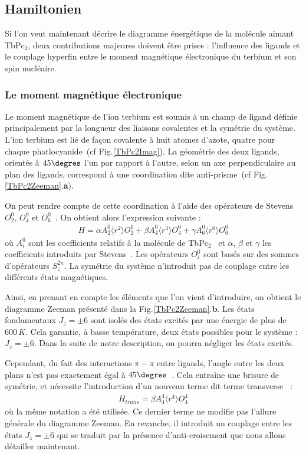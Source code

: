 \subsection{Hamiltonien}

Si l'on veut maintenant décrire le diagramme énergétique de la molécule aimant TbPc$_{2}$, deux contributions majeures doivent être prises : l'influence des ligands et le couplage hyperfin entre le moment magnétique électronique du terbium et son spin nucléaire.

\subsubsection{Le moment magnétique électronique}
Le moment magnétique de l'ion terbium est soumis à un champ de ligand définie principalement par la longueur des liaisons covalentes et la symétrie du système. 
L'ion terbium est lié de façon covalente à huit atomes d'azote, quatre pour chaque phatlocyanide~(cf Fig.\ref{TbPc2Imag}). La géométrie des deux ligands, orientés à $45\degres$ l'un par rapport à l'autre, selon un axe perpendiculaire au plan des ligands, correspond à une coordination dite anti-prisme~(cf Fig.\ref{TbPc2Zeeman}.\textbf{a}). 

On peut rendre compte de cette coordination à l'aide des opérateurs de Stevens $O_2^0$, $O_4^0$ et $O_6^0$~\cite{Stevens1952,Sorace2011}. On obtient alors l'expression suivante :
\begin{eqnarray}
H = \alpha A_2^0 \langle r^2 \rangle O_2^0 + \beta A_4^0 \langle r^4 \rangle O_4^0 + \gamma A_6^0 \langle r^6 \rangle O_6^0
\end{eqnarray}
où $A_i^0$ sont les coefficients relatifs à la molécule de TbPc$_2$~\cite{Ishikawa2005} et $\alpha$, $\beta$ et $\gamma$ les coefficients introduits par Stevens~\cite{Stevens1952}. Les opérateurs $O^0_i$ sont basés sur des sommes d'opérateurs $S_z^{2n}$. La symétrie du système n'introduit pas de couplage entre les différents états magnétiques. 

Ainsi, en prenant en compte les éléments que l'on vient d'introduire, on obtient le diagramme Zeeman présenté dans la Fig.\ref{TbPc2Zeeman}.\textbf{b}. Les états fondamentaux $J_z = \pm 6$ sont isolés des états excités par une énergie de plus de $600\,K$. Cela garantie, à basse température, deux états possibles pour le système : $J_z = \pm 6$. Dans la suite de notre description, on pourra négliger les états excités.

 
Cependant, du fait des interactions $\pi - \pi$ entre ligands, l'angle entre les deux plans n'est pas exactement égal à $45\degres$~\cite{Koike1996}. Cela entraîne une brisure de symétrie, et nécessite l'introduction d'un nouveau terme dit terme transverse~\cite{Sorace2011} :
\begin{eqnarray}
H_{trans} = \beta A_4^4 \langle r^4 \rangle O_4^4
\end{eqnarray}
où la m\^eme notation a été utilisée. Ce dernier terme ne modifie pas l'allure générale du diagramme Zeeman. En revanche, il introduit un couplage entre les états  $J_z = \pm 6$ qui se traduit par la présence d'anti-croisement que nous allons détailler maintenant.

